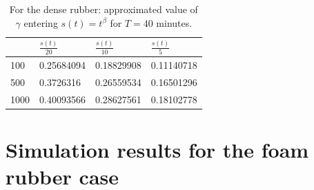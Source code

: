 \documentclass{article}
\begin{document}
	\begin {table}[h]
	\begin{center}
		\begin{tabular}{ |p{2.5cm}|p{2cm}|p{2cm}| p{2cm}|}
			\hline
			\diagbox{$a_0$}{$\sigma(s(t))$} & $\frac{s(t)}{20}$&$\frac{s(t)}{10}$& $\frac{s(t)}{5}$\\
			\hline
			100  &0.25684094& 0.18829908 & 0.11140718 \\
		500  &0.3726316 & 0.26559534 & 0.16501296\\
		1000&0.40093566& 0.28627561 &0.18102778 \\
			\hline
		\end{tabular}
		\caption {For the dense rubber: approximated value of  $\gamma$ entering $s(t) = t^\beta$ for $T = 40$ minutes.}
		\label{tab:1} 
	\end{center}
	\end {table}
	\newpage
\section{Simulation results for the foam rubber case}\label{Secfoam}
\end{document}
